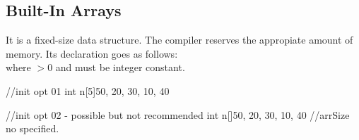 \subsection{Built-In Arrays}
\label{subsec:Built-In-Arrays}
It is a fixed-size data structure. The compiler reserves the appropiate amount of memory. Its declaration goes as follows:
\\
where $>0$ and must be integer constant.\\
\begin{minipage}{\MPWxXSxLISTING\textwidth} %
{} %
        \begin{CPPCode}
//init opt 01
int n[5]{50, 20, 30, 10, 40}
        \end{CPPCode}
    \end{minipage}
    \begin{minipage}{\MPWxSxLISTING\textwidth} %
        \begin{CPPCode}
//init opt 02  - possible but not recommended
int n[]{50, 20, 30, 10, 40} //arrSize no specified.
        \end{CPPCode}
\end{minipage}
